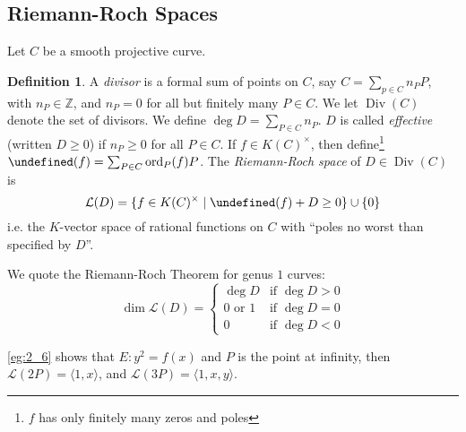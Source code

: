 \documentclass[11pt]{article}
\theoremstyle{definition}
\newtheorem*{definition*}{Definition}
\theoremstyle{plain}
\theoremstyle{remark}
\DeclareMathOperator{\ord}{ord}
\let\div\undefined
\DeclareMathOperator{\div}{div}
\DeclareMathOperator{\Div}{Div}
\newcommand{\ZZ}{\mathbb{Z}}
\newcommand{\cL}{\mathcal{L}}
\begin{document}
\subsection*{Riemann-Roch Spaces}

Let $C$ be a smooth projective curve.

\begin{definition*}
    A \emph{divisor} is a formal sum of points on $C$, say $C = \sum_{p \in C} n_P P$, with $n_P \in \ZZ$, and $n_P = 0$ for all but finitely many $P \in C$. We let $\Div(C)$ denote the set of divisors. We define $\deg D = \sum_{P \in C} n_P$. $D$ is called \emph{effective} (written $D \ge 0$) if $n_P \ge 0$ for all $P \in C$. If $f \in K(C)^\times$, then define\footnote{$f$ has only finitely many zeros and poles} $\div(f) = \sum_{P \in C} \ord_P(f) P$. The \emph{Riemann-Roch space} of $D \in \Div(C)$ is
    \begin{equation*}
        \cL(D) = \{f \in K(C)^\times \mid \div(f) + D \ge 0\} \cup \{0\}
    \end{equation*}
    i.e. the $K$-vector space of rational functions on $C$ with ``poles no worst than specified by $D$''.
\end{definition*}

We quote the Riemann-Roch Theorem for genus $1$ curves:
\begin{equation*}
    \dim \cL(D) =
    \begin{cases}
        \deg D &\text{if } \deg D > 0\\
        0 \text{ or } 1 &\text{if } \deg D = 0\\
        0 &\text{if } \deg D < 0
    \end{cases}
\end{equation*}

\autoref{eg:2_6} shows that $E : y^2 = f(x)$ and $P$ is the point at infinity, then $\cL(2P) = \langle 1,x \rangle$, and $\cL(3P) = \langle 1,x,y \rangle$.
\end{document}
